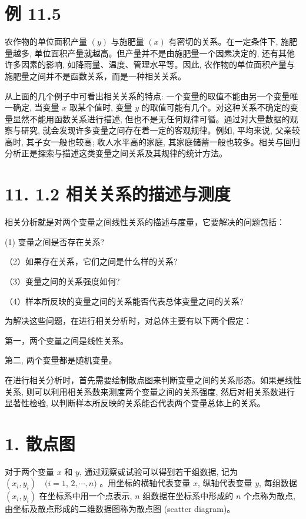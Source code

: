 \documentclass[10pt]{article}
\begin{document}
\begin{CJK*}{UTF8}{bsmi}
\section*{例 11.5}
农作物的单位面积产量 $(y)$ 与施肥量 $(x)$ 有密切的关系。在一定条件下, 施肥量越多, 单位面积产量就越高。但产量并不是由施肥量一个因素决定的, 还有其他许多因素的影响, 如降雨量、温度、管理水平等。因此, 农作物的单位面积产量与施肥量之间并不是函数关系，而是一种相关关系。

从上面的几个例子中可看出相关关系的特点: 一个变量的取值不能由另一个变量唯一确定, 当变量 $x$ 取某个值时, 变量 $y$ 的取值可能有几个。对这种关系不确定的变量显然不能用函数关系进行描述, 但也不是无任何规律可循。通过对大量数据的观察与研究, 就会发现许多变量之间存在着一定的客观规律。例如, 平均来说, 父亲较高时, 其子女一般也较高; 收人水平高的家庭, 其家庭储蓄一般也较多。相关与回归分析正是探索与描述这类变量之间关系及其规律的统计方法。

\section*{11. 1.2 相关关系的描述与测度}
相关分析就是对两个变量之间线性关系的描述与度量，它要解决的问题包括：

(1) 变量之间是否存在关系?

（2）如果存在关系，它们之间是什么样的关系?

（3）变量之间的关系强度如何?

（4）样本所反映的变量之间的关系能否代表总体变量之间的关系?

为解决这些问题，在进行相关分析时，对总体主要有以下两个假定：

第一，两个变量之间是线性关系。

第二, 两个变量都是随机变量。

在进行相关分析时，首先需要绘制散点图来判断变量之间的关系形态。如果是线性关系, 则可以利用相关系数来测度两个变量之间的关系强度, 然后对相关系数进行显著性检验, 以判断样本所反映的关系能否代表两个变量总体上的关系。

\section*{1. 散点图}
对于两个变量 $x$ 和 $y$, 通过观察或试验可以得到若干组数据, 记为 $\left(x_{i}, y_{i}\right) \quad(i=1$, $2, \cdots, n)$ 。用坐标的横轴代表变量 $x$, 纵轴代表变量 $y$, 每组数据 $\left(x_{i}, y_{i}\right)$ 在坐标系中用一个点表示, $n$ 组数据在坐标系中形成的 $n$ 个点称为散点, 由坐标及散点形成的二维数据图称为散点图 (scatter diagram)。


\end{CJK*}
\end{document}
